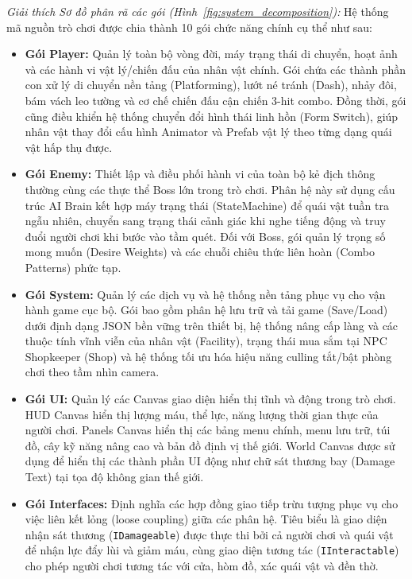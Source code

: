\documentclass[../DoAn.tex]{subfiles}
\begin{document}
\textit{Giải thích Sơ đồ phân rã các gói (Hình~\ref{fig:system_decomposition}):}
Hệ thống mã nguồn trò chơi được chia thành 10 gói chức năng chính cụ thể như sau:
\begin{itemize}
    \item \textbf{Gói Player:} Quản lý toàn bộ vòng đời, máy trạng thái di chuyển, hoạt ảnh và các hành vi vật lý/chiến đấu của nhân vật chính. Gói chứa các thành phần con xử lý di chuyển nền tảng (Platforming), lướt né tránh (Dash), nhảy đôi, bám vách leo tường và cơ chế chiến đấu cận chiến 3-hit combo. Đồng thời, gói cũng điều khiển hệ thống chuyển đổi hình thái linh hồn (Form Switch), giúp nhân vật thay đổi cấu hình Animator và Prefab vật lý theo từng dạng quái vật hấp thụ được.
    \item \textbf{Gói Enemy:} Thiết lập và điều phối hành vi của toàn bộ kẻ địch thông thường cùng các thực thể Boss lớn trong trò chơi. Phân hệ này sử dụng cấu trúc AI Brain kết hợp máy trạng thái (StateMachine) để quái vật tuần tra ngẫu nhiên, chuyển sang trạng thái cảnh giác khi nghe tiếng động và truy đuổi người chơi khi bước vào tầm quét. Đối với Boss, gói quản lý trọng số mong muốn (Desire Weights) và các chuỗi chiêu thức liên hoàn (Combo Patterns) phức tạp.
    \item \textbf{Gói System:} Quản lý các dịch vụ và hệ thống nền tảng phục vụ cho vận hành game cục bộ. Gói bao gồm phân hệ lưu trữ và tải game (Save/Load) dưới định dạng JSON bền vững trên thiết bị, hệ thống nâng cấp làng và các thuộc tính vĩnh viễn của nhân vật (Facility), trạng thái mua sắm tại NPC Shopkeeper (Shop) và hệ thống tối ưu hóa hiệu năng culling tắt/bật phòng chơi theo tầm nhìn camera.
    \item \textbf{Gói UI:} Quản lý các Canvas giao diện hiển thị tĩnh và động trong trò chơi. HUD Canvas hiển thị lượng máu, thể lực, năng lượng thời gian thực của người chơi. Panels Canvas hiển thị các bảng menu chính, menu lưu trữ, túi đồ, cây kỹ năng nâng cao và bản đồ định vị thế giới. World Canvas được sử dụng để hiển thị các thành phần UI động như chữ sát thương bay (Damage Text) tại tọa độ không gian thế giới.
    \item \textbf{Gói Interfaces:} Định nghĩa các hợp đồng giao tiếp trừu tượng phục vụ cho việc liên kết lỏng (loose coupling) giữa các phân hệ. Tiêu biểu là giao diện nhận sát thương (\texttt{IDamageable}) được thực thi bởi cả người chơi và quái vật để nhận lực đẩy lùi và giảm máu, cùng giao diện tương tác (\texttt{IInteractable}) cho phép người chơi tương tác với cửa, hòm đồ, xác quái vật và đền thờ.

\end{itemize}
\end{document}

